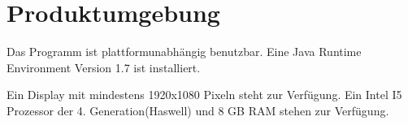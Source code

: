 
\section{Produktumgebung}

Das Programm ist plattformunabhängig benutzbar.
Eine Java Runtime Environment Version 1.7 ist installiert.

Ein Display mit mindestens 1920x1080 Pixeln steht zur Verfügung.
Ein Intel I5 Prozessor der 4. Generation(Haswell) und 8 GB RAM stehen zur Verfügung.